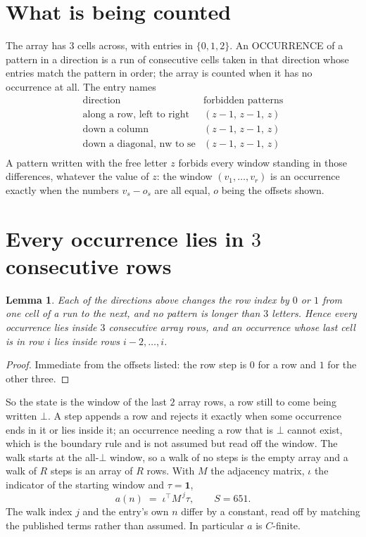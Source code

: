 \documentclass[11pt,a4paper]{article}
\theoremstyle{plain}
\newtheorem{lemma}[theorem]{Lemma}
\theoremstyle{definition}
\begin{document}
\section{What is being counted}

The array has $3$ cells across, with entries in $\{0,1,2\}$. An OCCURRENCE of a pattern in a
direction is a run of consecutive cells taken in that direction whose entries match the pattern
in order; the array is counted when it has no occurrence at all. The entry names
\[
\begin{array}{ll}
\text{direction} & \text{forbidden patterns} \\[2pt]
\text{along a row, left to right} & (z-1,\,z-1,\,z) \\
\text{down a column} & (z-1,\,z-1,\,z) \\
\text{down a diagonal, nw to se} & (z-1,\,z-1,\,z) \\
\end{array}
\]
 A pattern written with the free letter $z$ forbids every window standing in those differences, whatever the value of $z$: the window $(v_1,\dots,v_r)$ is an occurrence exactly when the numbers $v_s-o_s$ are all equal, $o$ being the offsets shown.

\section{Every occurrence lies in $3$ consecutive rows}

\begin{lemma}\label{lem:win}
Each of the directions above changes the row index by $0$ or $1$ from one cell of a run to the
next, and no pattern is longer than $3$ letters. Hence every occurrence lies inside $3$
consecutive array rows, and an occurrence whose last cell is in row $i$ lies inside rows
$i-2,\dots,i$.
\end{lemma}

\begin{proof}
Immediate from the offsets listed: the row step is $0$ for a row and $1$ for the other three.
\end{proof}

So the state is the window of the last $2$ array rows, a row still to come being written
$\bot$. A step appends a row and rejects it exactly when some occurrence ends in it or lies
inside it; an occurrence needing a row that is $\bot$ cannot exist, which is the boundary rule
and is not assumed but read off the window. The walk starts at the all-$\bot$ window, so a walk
of no steps is the empty array and a walk of $R$ steps is an array of $R$ rows. With $M$ the
adjacency matrix, $\iota$ the indicator of the starting window and $\tau=\mathbf{1}$,
\[
a(n)\;=\;\iota^{\!\top}M^{\,j}\tau ,\qquad S=651.
\]
The walk index $j$ and the entry's own $n$ differ by a constant, read off by matching the
published terms rather than assumed. In particular $a$ is $C$-finite.
\end{document}

